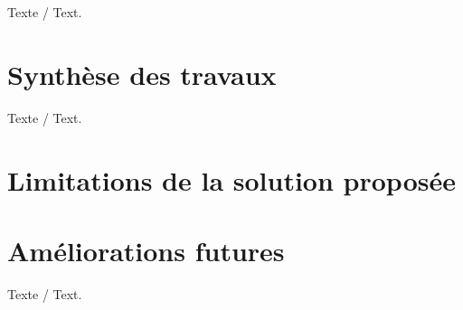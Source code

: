 \label{sec:Conclusion}
Texte / Text.

\section{Synthèse des travaux}
Texte / Text.

\section{Limitations de la solution proposée}\label{sec:Limitations}

\section{Améliorations futures}
Texte / Text.
